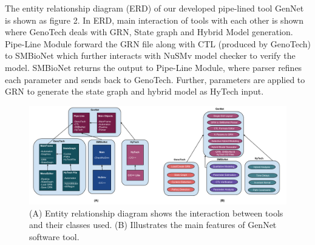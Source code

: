 \documentclass[twocolumn]{bmcart}%
\begin{document}
The entity relationship diagram (ERD) of our developed pipe-lined tool GenNet is shown as figure 2. In ERD, main interaction of tools with each other is shown where GenoTech deals with GRN, State graph and Hybrid Model generation. Pipe-Line Module forward the GRN file along with CTL (produced by GenoTech) to SMBioNet which further interacts with NuSMv model checker to verify the model. SMBioNet returns the output to Pipe-Line Module, where parser refines each parameter and sends back to GenoTech. Further, parameters are applied to GRN to generate the state graph and hybrid model as HyTech input.
\begin{figure}[!ht] 
  \includegraphics[scale=.31]{figures/ERD.pdf}
  \caption{
      (A) Entity relationship diagram shows the interaction between tools and their classes used. (B) Illustrates the main features of GenNet software tool.}
   
      \end{figure}
\end{document}
